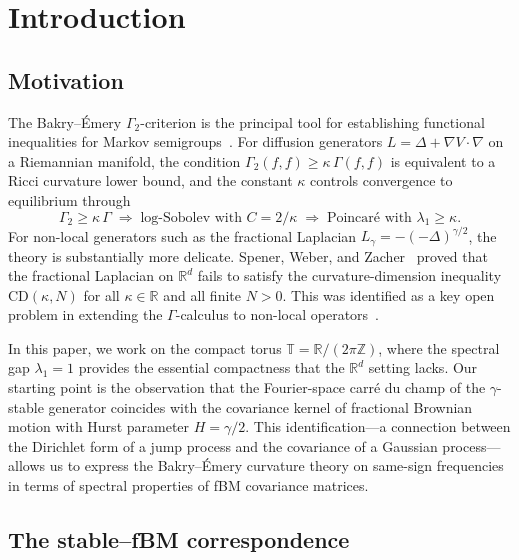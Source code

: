 \documentclass[11pt,a4paper]{article}
\theoremstyle{plain}
\theoremstyle{definition}
\theoremstyle{remark}
\newcommand{\R}{\mathbb{R}}
\newcommand{\Z}{\mathbb{Z}}
\newcommand{\T}{\mathbb{T}}
\begin{document}
\section{Introduction}\label{sec:intro}

\subsection{Motivation}

The Bakry--\'Emery $\Gamma_2$-criterion is the principal tool for
establishing functional inequalities for Markov
semigroups~\cite{BakryGentilLedoux2014}. For diffusion generators
$L = \Delta + \nabla V \cdot \nabla$ on a Riemannian manifold,
the condition $\Gamma_2(f,f) \geq \kappa\,\Gamma(f,f)$ is equivalent
to a Ricci curvature lower bound, and the constant $\kappa$ controls
convergence to equilibrium through
\[
  \Gamma_2 \geq \kappa\,\Gamma
  \;\Longrightarrow\;
  \text{log-Sobolev with } C = 2/\kappa
  \;\Longrightarrow\;
  \text{Poincar\'e with } \lambda_1 \geq \kappa.
\]
For non-local generators such as the fractional Laplacian
$L_\gamma = -(-\Delta)^{\gamma/2}$, the theory is substantially
more delicate. Spener, Weber, and
Zacher~\cite{SpenerWeberZacher2020} proved that the fractional
Laplacian on $\R^d$ fails to satisfy the curvature-dimension inequality
$\mathrm{CD}(\kappa,N)$ for all $\kappa \in \R$ and all finite $N > 0$.
This was identified as a key open problem in extending the $\Gamma$-calculus
to non-local operators~\cite{Garofalo2019}.

In this paper, we work on the compact torus $\T = \R/(2\pi\Z)$, where
the spectral gap $\lambda_1 = 1$ provides the essential compactness that
the $\R^d$ setting lacks.  Our starting point is the observation that
the Fourier-space carr\'e du champ of the $\gamma$-stable generator
coincides with the covariance kernel of fractional Brownian motion
with Hurst parameter $H = \gamma/2$.
This identification---a connection between the Dirichlet form of a
jump process and the covariance of a Gaussian process---allows us to
express the Bakry--\'Emery curvature theory on same-sign frequencies
in terms of spectral properties of fBM covariance matrices.


\subsection{The stable--fBM correspondence}
\end{document}
